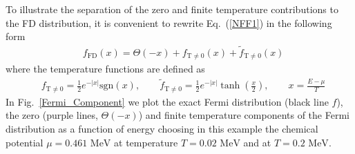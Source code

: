 \documentclass[sn-mathphys,Numbered]{sn-jnl}
\newcommand*{\MeV}{\text{ MeV}}
\newcommand*{\xmagenta}{\color{magenta}}
\begin{document}
To illustrate the separation of the zero and finite temperature contributions to the FD distribution, it is convenient to rewrite Eq.~(\ref{NFF1}) in the following form
\begin{align}\label{Eq_form}
&f_\mathrm{FD}(x)=\Theta(-x)+f_\mathrm{T\neq0}(x)+\widetilde f_\mathrm{T\neq0}(x)
\end{align}
where the temperature functions are defined as
\begin{align}
&f_\mathrm{T\neq0}=\frac{1}{2}e^{ -|x| }\mathrm{sgn}\left(x\right),\qquad
\widetilde f_\mathrm{T\neq0}=\frac{1}{2}e^{ - |x| }\tanh\left(\frac{x}{2}\right),\qquad x=\frac{E-\mu}{T}
\end{align}
In Fig.~\ref{Fermi_Component} we plot the exact Fermi distribution (black line $f$), the zero (purple lines, $\Theta(-x)$) and finite temperature components of the Fermi distribution as a function of energy choosing in this example the chemical potential $\mu=0.461\MeV$ at temperature $T=0.02\MeV$ and at $T=0.2\MeV$.
\end{document}
